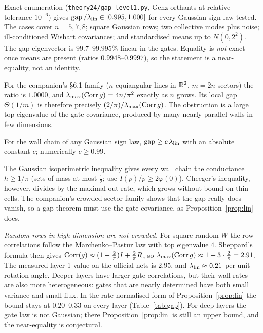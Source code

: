 \begin{remark}\label{rem:near}
Exact enumeration (\texttt{theory24/gap\_level1.py}, Genz orthants at relative tolerance $10^{-6}$) gives
$\operatorname{gap}/\lambda_{\rm lin}\in[0.995,1.000]$ for every Gaussian sign law tested. The cases cover $n=5,7,8$; square Gaussian
rows; two collective modes plus noise; ill-conditioned Wishart covariances; and standardised means up to $N(0,2^2)$. The
gap eigenvector is $99.7$--$99.995\%$ linear in the gates. Equality is \emph{not} exact once means are present (ratios
$0.9948$--$0.9997$), so the statement is a near-equality, not an identity.

For the companion's \S6.1 family ($n$ equiangular lines in $\mathbb{R}^2$, $m=2n$ sectors) the ratio is $1.0000$, and
$\lambda_{\max}(\operatorname{Corr} g)=4n/\pi^2$ exactly as $n$ grows. Its local gap $\Theta(1/m)$ is therefore precisely
$(2/\pi)/\lambda_{\max}(\operatorname{Corr} g)$. The obstruction is a large top eigenvalue of the gate covariance, produced by many
nearly parallel walls in few dimensions.
\end{remark}

\begin{conjecture}\label{conj:lin}
For the wall chain of any Gaussian sign law, $\operatorname{gap}\ge c\,\lambda_{\rm lin}$ with an absolute constant $c$; numerically
$c\ge0.99$.
\end{conjecture}

\begin{remark}
The Gaussian isoperimetric inequality gives every wall chain the conductance $h\ge1/\pi$ (sets of mass at most
$\tfrac12$; use $I(p)/p\ge2\varphi(0)$). Cheeger's inequality, however, divides by the maximal out-rate, which grows
without bound on thin cells. The companion's crowded-sector family shows that the gap really does vanish, so a gap theorem
must use the gate covariance, as Proposition~\ref{prop:lin} does.
\end{remark}

\emph{Random rows in high dimension are not crowded.} For square random $W$ the row correlations follow the
Marchenko--Pastur law with top eigenvalue $4$. Sheppard's formula then gives $\operatorname{Corr}(g)\approx(1-\frac2\pi)I+\frac2\pi R$,
so $\lambda_{\max}(\operatorname{Corr} g)\approx 1+3\cdot\frac2\pi=2.91$. The measured layer-1 value on the official nets is $2.95$, and
$\lambda_{\rm lin}\approx0.21$ per unit rotation angle. Deeper layers have larger gate correlations, but their wall rates
are also more heterogeneous: gates that are nearly determined have both small variance and small flux. In the
rate-normalised form of Proposition~\ref{prop:lin} the bound stays at $0.20$--$0.33$ on every layer
(Table~\ref{tab:gap}). For deep layers the gate law is not Gaussian; there Proposition~\ref{prop:lin} is still an upper
bound, and the near-equality is conjectural.
